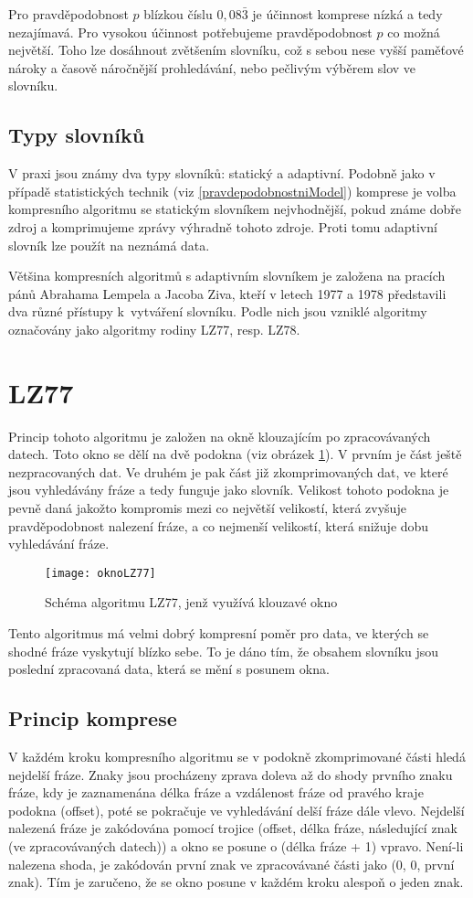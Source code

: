 Pro pravděpodobnost $p$ blízkou číslu $0,08\bar{3}$ je účinnost komprese nízká a tedy nezajímavá. Pro vysokou účinnost potřebujeme pravděpodobnost $p$ co možná největší. Toho lze dosáhnout zvětšením slovníku, což s sebou nese vyšší paměťové nároky a časově náročnější prohledávání, nebo pečlivým výběrem slov ve slovníku.

\subsection{Typy slovníků}
V praxi jsou známy dva typy slovníků: statický a adaptivní. Podobně jako v případě statistických technik (viz \ref{pravdepodobnostniModel}) komprese je volba kompresního algoritmu se statickým slovníkem nejvhodnější, pokud známe dobře zdroj a komprimujeme zprávy výhradně tohoto zdroje. Proti tomu adaptivní slovník lze použít na neznámá data.

Většina kompresních algoritmů s adaptivním slovníkem je založena na pracích pánů Abrahama Lempela a Jacoba Ziva, kteří v letech 1977 a 1978 představili dva různé přístupy k~vytváření slovníku. Podle nich jsou vzniklé algoritmy označovány jako algoritmy rodiny LZ77, resp. LZ78.

\section{LZ77}
Princip tohoto algoritmu je založen na okně klouzajícím po zpracovávaných datech. Toto okno se dělí na dvě podokna (viz obrázek \ref{oknoLZ77}). V prvním je část ještě nezpracovaných dat. Ve druhém je pak část již zkomprimovaných dat, ve které jsou vyhledávány fráze a tedy funguje jako slovník. Velikost tohoto podokna je pevně daná jakožto kompromis mezi co největší velikostí, která zvyšuje pravděpodobnost nalezení fráze, a co nejmenší velikostí, která snižuje dobu vyhledávání fráze.

\begin{figure}[!htb]
\centering
\texttt{[image: oknoLZ77]}
\caption{Schéma algoritmu LZ77, jenž využívá klouzavé okno}
\label{oknoLZ77}
\end{figure}

Tento algoritmus má velmi dobrý kompresní poměr pro data, ve kterých se shodné fráze vyskytují blízko sebe. To je dáno tím, že obsahem slovníku jsou poslední zpracovaná data, která se mění s posunem okna.

\subsection{Princip komprese}
V každém kroku kompresního algoritmu se v podokně zkomprimované části hledá nejdelší fráze. Znaky jsou procházeny zprava doleva až do shody prvního znaku fráze, kdy je zaznamenána délka fráze a vzdálenost fráze od pravého kraje podokna (offset), poté se pokračuje ve vyhledávání delší fráze dále vlevo. Nejdelší nalezená fráze je zakódována pomocí trojice (offset, délka fráze, následující znak (ve zpracovávaných datech)) a okno se posune o (délka fráze + 1) vpravo. Není-li nalezena shoda, je zakódován první znak ve zpracovávané části jako (0, 0, první znak). Tím je zaručeno, že se okno posune v každém kroku alespoň o jeden znak.

